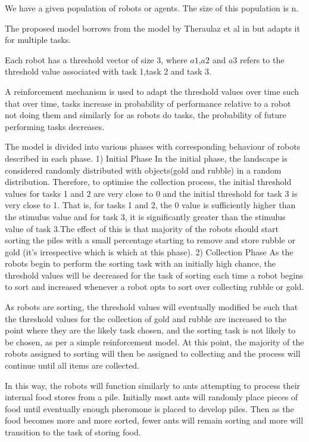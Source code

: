 \documentclass[12pt]{article}
\begin{document}
We have a given population of robots or agents. The size of this population is n.

The proposed model borrows from the model by Theraulaz et al in \cite{Theraulaz327} but adapts it for multiple tasks.

Each robot has a threshold vector of size 3, where $a1$,$a2$ and $a3$ refers to the threshold value associated with task 1,task 2 and task 3.

A reinforcement mechanism is used to adapt the threshold values over time such that over time, tasks increase in probability of performance relative to a robot not doing them and similarly for as robots do tasks, the probability of future performing tasks decreases.

The model is divided into various phases with corresponding behaviour of robots described in each phase.
1) Initial Phase
In the initial phase, the landscape is considered randomly distributed with objects(gold and rubble) in a random distribution.
Therefore, to optimise the collection process, the initial threshold values for tasks 1 and 2 are very close to 0 and the initial threshold for task 3 is very close to 1. That is, for tasks 1 and 2, the 0 value is sufficiently higher than the stimulus value and for task 3, it is significantly greater than the stimulus value of task 3.The effect of this is that majority of the robots should start sorting the piles with a small percentage starting to remove and store rubble or gold (it's irrespective which is which at this phase).	
2) Collection Phase
As the robots begin to perform the sorting task with an initially high chance, the threshold values will be decreased for the task of sorting each time a robot begins to sort and increased whenever a robot opts to sort over collecting rubble or gold.

As robots are sorting, the threshold values will eventually modified be such that the threshold values for the collection of gold and rubble are increased to the point where they are the likely task chosen, and the sorting task is not likely to be chosen, as per a simple reinforcement model. At this point, the majority of the robots assigned to sorting will then be assigned to collecting and the process will continue until all items are collected.

In this way, the robots will function similarly to ants attempting to process their internal food stores from a pile. Initially most ants will randomly place pieces of food until eventually enough pheromone is placed to develop piles. Then as the food becomes more and more sorted, fewer ants will remain sorting and more will transition to the task of storing food.
\end{document}
